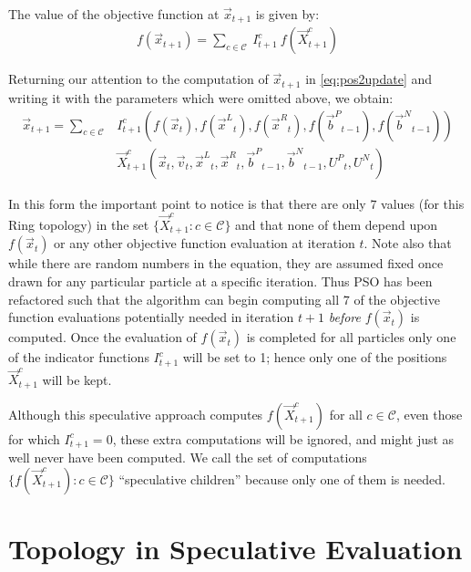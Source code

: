 \documentclass[ms,electronic,twosidetoc,letterpaper,chaptercenter,parttop,equalmargins]{byumsphd}
\providecommand{\pers}{\ensuremath{P}}
\providecommand{\neigh}{\ensuremath{N}}
\providecommand{\leftind}{\ensuremath{L}}
\providecommand{\rightind}{\ensuremath{R}}
\providecommand{\nURand}{\ensuremath{U^\neigh}}
\providecommand{\pURand}{\ensuremath{U^\pers}}
\providecommand{\ppos}{\ensuremath{\Vec{x}}}
\providecommand{\pvel}{\ensuremath{\Vec{v}}}
\providecommand{\nbest}{\ensuremath{\Vec{b}^\neigh}}
\providecommand{\pbest}{\ensuremath{\Vec{b}^\pers}}
\providecommand{\ofunc}{\ensuremath{f}}
\providecommand{\indic}{\ensuremath{I}}
\providecommand{\specpos}{\ensuremath{\vec{X}}}
\providecommand{\leftn}{\ensuremath{\Vec{x}^\leftind}}
\providecommand{\rightn}{\ensuremath{\Vec{x}^\rightind}}
\providecommand{\caseset}{\ensuremath{\mathcal{C}}}
\providecommand{\casegen}{\ensuremath{c}}
\begin{document}
The value of the objective function at $\ppos_{t+1}$ is given by:
\begin{align}
\label{eq:val2update}
	\ofunc (\ppos_{t+1}) = \sum_{c \in \caseset} \ \indic_{t+1}^{c}
	\ \ofunc(\specpos_{t+1}^{c})
\end{align}

Returning our attention to the computation of $\ppos_{t+1}$ in
\eqref{eq:pos2update} and writing it with the parameters which were omitted
above, we obtain:
\begin{align}
\nonumber
  \ppos_{t+1} = \sum_{c \in \caseset}
	&\indic_{t+1}^{c}(\ofunc ( \ppos_{t} ) ,\ofunc(\leftn_{t}),
	\ofunc(\rightn_{t}) ,\ofunc(\pbest_{t-1}) ,\ofunc(\nbest_{t-1})) \\
\label{eq:val2updatelong}
	& \specpos_{t+1}^{c}(\ppos_{t},\pvel_{t},\leftn_{t},\rightn_{t},
	\pbest_{t-1},\nbest_{t-1},\pURand_{t}, \nURand_{t})
\end{align}

In this form the important point to notice is that there are only $7$ values
(for this Ring topology) in the set $\{\specpos_{t+1}^{\casegen}: \casegen \in
\caseset\}$ and that none of them depend upon $f(\ppos_t)$ or any other
objective function evaluation at iteration $t$.  Note also that while there are
random numbers in the equation, they are assumed fixed once drawn for any
particular particle at a specific iteration.  Thus PSO has been refactored such
that the algorithm can begin computing all $7$ of the objective function
evaluations potentially needed in iteration $t+1$ \emph{before} $f(\ppos_t)$ is
computed.  Once the evaluation of $f(\ppos_{t})$ is completed for all particles
only one of the indicator functions $\indic_{t+1}^{\casegen}$ will be set to 1;
hence only one of the positions $\specpos_{t+1}^\casegen$ will be kept.

Although this speculative approach computes $\ofunc(\specpos_{t+1}^{\casegen})$
for all $\casegen \in \caseset$, even those for which $\indic_{t+1}^{\casegen}
= 0$, these extra computations will be ignored, and might just as well never
have been computed.  We call the set of computations
$\{\ofunc(\specpos_{t+1}^{c}) : \casegen \in \caseset\}$ ``speculative
children'' because only one of them is needed.

\section{Topology in Speculative Evaluation}
\label{sec:topology}
\end{document}
